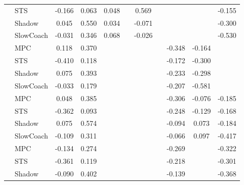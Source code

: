 \begin{tabular}{|l|l|*{9}{c|}}
                                                           & STS &   -0.166 &     0.063 &     0.048 &     &  0.569 &     &      &      &   -0.155 \\
                                                           & Shadow &    0.045 &     0.550 &     0.034 &     & -0.071 &     &      &      &   -0.300 \\
                                                           & SlowCoach &   -0.031 &     0.346 &     0.068 &     & -0.026 &     &      &      &   -0.530 \\
\midrule
[True, True, False, False, False, False, True, True, False] & MPC &    0.118 &     0.370 &        &     &     &     &  -0.348 &  -0.164 &       \\
                                                           & STS &   -0.410 &     0.118 &        &     &     &     &  -0.172 &  -0.300 &       \\
                                                           & Shadow &    0.075 &     0.393 &        &     &     &     &  -0.233 &  -0.298 &       \\
                                                           & SlowCoach &   -0.033 &     0.179 &        &     &     &     &  -0.207 &  -0.581 &       \\
\midrule
[True, True, False, False, False, False, True, True, True] & MPC &    0.048 &     0.385 &        &     &     &     &  -0.306 &  -0.076 &   -0.185 \\
                                                           & STS &   -0.362 &     0.093 &        &     &     &     &  -0.248 &  -0.129 &   -0.168 \\
                                                           & Shadow &    0.075 &     0.574 &        &     &     &     &  -0.094 &   0.073 &   -0.184 \\
                                                           & SlowCoach &   -0.109 &     0.311 &        &     &     &     &  -0.066 &   0.097 &   -0.417 \\
\midrule
[True, True, False, False, False, False, True, False, True] & MPC &   -0.134 &     0.274 &        &     &     &     &  -0.269 &      &   -0.322 \\
                                                           & STS &   -0.361 &     0.119 &        &     &     &     &  -0.218 &      &   -0.301 \\
                                                           & Shadow &   -0.090 &     0.402 &        &     &     &     &  -0.139 &      &   -0.368 \\

\end{tabular}
